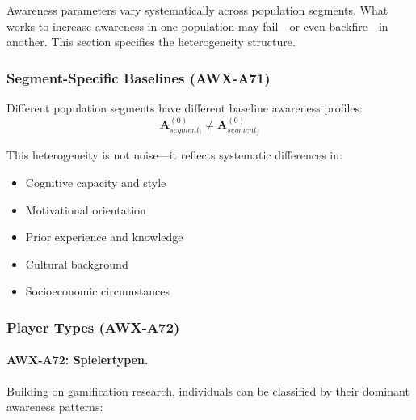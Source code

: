 
Awareness parameters vary systematically across population segments. 
What works to increase awareness in one population may fail—or even 
backfire—in another. This section specifies the heterogeneity structure.

\subsubsection{Segment-Specific Baselines (AWX-A71)}

\begin{axiom}
Different population segments have different baseline awareness profiles:
\begin{equation}
\mathbf{A}^{(0)}_{segment_i} \neq \mathbf{A}^{(0)}_{segment_j}
\end{equation}
\end{axiom}

This heterogeneity is not noise—it reflects systematic differences in:
\begin{itemize}
    \item Cognitive capacity and style
    \item Motivational orientation
    \item Prior experience and knowledge
    \item Cultural background
    \item Socioeconomic circumstances
\end{itemize}

\subsubsection{Player Types (AWX-A72)}

\paragraph{AWX-A72: Spielertypen.}
Building on gamification research, individuals can be classified by 
their dominant awareness patterns:

